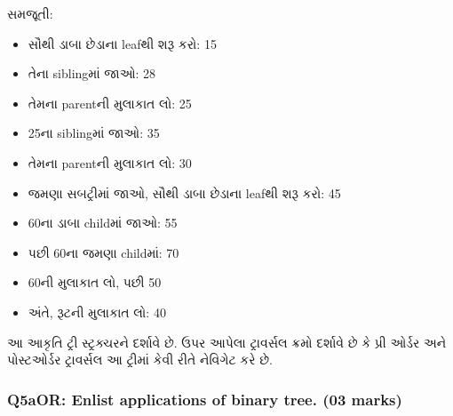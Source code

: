 \begin{enumerate}
  સમજૂતી:

  \begin{itemize}
  \tightlist
  \item
    સૌથી ડાબા છેડાના leafથી શરૂ કરો: 15
  \item
    તેના siblingમાં જાઓ: 28
  \item
    તેમના parentની મુલાકાત લો: 25
  \item
    25ના siblingમાં જાઓ: 35
  \item
    તેમના parentની મુલાકાત લો: 30
  \item
    જમણા સબટ્રીમાં જાઓ, સૌથી ડાબા છેડાના leafથી શરૂ કરો: 45
  \item
    60ના ડાબા childમાં જાઓ: 55
  \item
    પછી 60ના જમણા childમાં: 70
  \item
    60ની મુલાકાત લો, પછી 50
  \item
    અંતે, રૂટની મુલાકાત લો: 40
  \end{itemize}
\end{enumerate}

\begin{Shaded}
\begin{Highlighting}[]
    
\end{Highlighting}
\end{Shaded}

આ આકૃતિ ટ્રી સ્ટ્રક્ચરને દર્શાવે છે. ઉપર આપેલા ટ્રાવર્સલ ક્રમો દર્શાવે છે કે પ્રી ઓર્ડર અને
પોસ્ટઓર્ડર ટ્રાવર્સલ આ ટ્રીમાં કેવી રીતે નેવિગેટ કરે છે.

\hypertarget{q5aor-enlist-applications-of-binary-tree.-03-marks}{%
\subsubsection{Q5aOR: Enlist applications of binary tree. (03
marks)}\label{q5aor-enlist-applications-of-binary-tree.-03-marks}}

